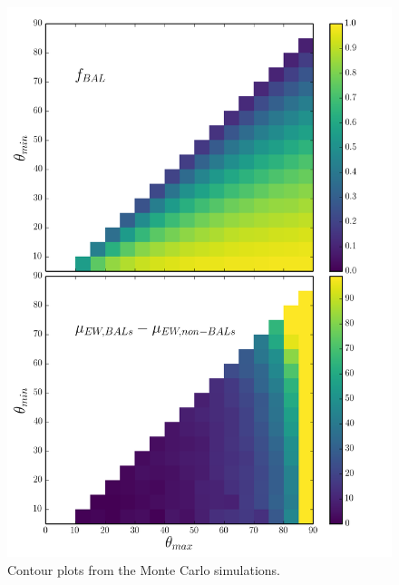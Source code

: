\begin{figure} %
\centering
\includegraphics[width=1.0\textwidth]{figures/ewpaper/faceon_ew_o3_faceon_sdss.png}
\caption
{
Contour plots from the Monte Carlo simulations.
}
\label{fig:o3_faceon}
\end{figure} %

